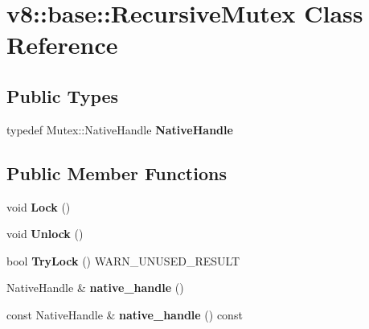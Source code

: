 \hypertarget{classv8_1_1base_1_1_recursive_mutex}{}\section{v8\+:\+:base\+:\+:Recursive\+Mutex Class Reference}
\label{classv8_1_1base_1_1_recursive_mutex}
\subsection*{Public Types}
\begin{DoxyCompactItemize}
\item 
typedef Mutex\+::\+Native\+Handle {\bfseries Native\+Handle}\hypertarget{classv8_1_1base_1_1_recursive_mutex_af385c974da92c2f19aa048b9f456ca56}{}\label{classv8_1_1base_1_1_recursive_mutex_af385c974da92c2f19aa048b9f456ca56}

\end{DoxyCompactItemize}
\subsection*{Public Member Functions}
\begin{DoxyCompactItemize}
\item 
void {\bfseries Lock} ()\hypertarget{classv8_1_1base_1_1_recursive_mutex_a37a8771b715dac556b099bd4f90a5e12}{}\label{classv8_1_1base_1_1_recursive_mutex_a37a8771b715dac556b099bd4f90a5e12}

\item 
void {\bfseries Unlock} ()\hypertarget{classv8_1_1base_1_1_recursive_mutex_a7b1000f25567ddf72687c1b77426dd18}{}\label{classv8_1_1base_1_1_recursive_mutex_a7b1000f25567ddf72687c1b77426dd18}

\item 
bool {\bfseries Try\+Lock} () W\+A\+R\+N\+\_\+\+U\+N\+U\+S\+E\+D\+\_\+\+R\+E\+S\+U\+LT\hypertarget{classv8_1_1base_1_1_recursive_mutex_a90fdf1365377493d984eedb3883ae6bb}{}\label{classv8_1_1base_1_1_recursive_mutex_a90fdf1365377493d984eedb3883ae6bb}

\item 
Native\+Handle \& {\bfseries native\+\_\+handle} ()\hypertarget{classv8_1_1base_1_1_recursive_mutex_a42a062720a68510d37769b680b9ac4cb}{}\label{classv8_1_1base_1_1_recursive_mutex_a42a062720a68510d37769b680b9ac4cb}

\item 
const Native\+Handle \& {\bfseries native\+\_\+handle} () const \hypertarget{classv8_1_1base_1_1_recursive_mutex_ade26b3d42f47cc1db935ce9745bd1940}{}\label{classv8_1_1base_1_1_recursive_mutex_ade26b3d42f47cc1db935ce9745bd1940}

\end{DoxyCompactItemize}
